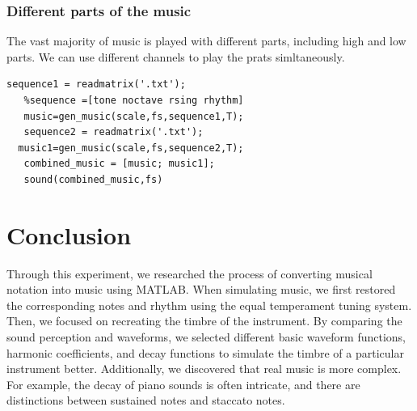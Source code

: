 \documentclass[journal]{IEEEtran}
\begin{document}
\subsubsection{Different parts of the music}
The vast majority of music is played with different parts, including high and low parts. We can use different channels to play the prats simltaneously.

\begin{lstlisting}[style=Matlab-editor]
   sequence1 = readmatrix('.txt');
   %sequence =[tone noctave rsing rhythm]
   music=gen_music(scale,fs,sequence1,T);
   sequence2 = readmatrix('.txt');
  music1=gen_music(scale,fs,sequence2,T);
   combined_music = [music; music1];
   sound(combined_music,fs)
\end{lstlisting}
\section{Conclusion}
Through this experiment, we researched the process of converting musical notation into music using MATLAB. When simulating music, we first restored the corresponding notes and rhythm using the equal temperament tuning system. Then, we focused on recreating the timbre of the instrument. By comparing the sound perception and waveforms, we selected different basic waveform functions, harmonic coefficients, and decay functions to simulate the timbre of a particular instrument better. Additionally, we discovered that real music is more complex. For example, the decay of piano sounds is often intricate, and there are distinctions between sustained notes and staccato notes.
\end{document}
